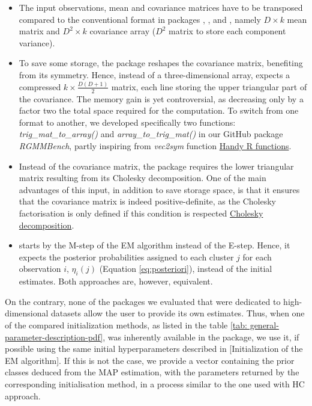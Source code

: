\begin{itemize}
\item
  The input observations, mean and covariance matrices have to be transposed compared to the conventional format in packages , ,  and , namely \(D \times k\) mean matrix and \(D^2 \times k\) covariance array (\(D^2\) matrix to store each component variance).
\item
  To save some storage, the  package reshapes the covariance matrix, benefiting from its symmetry. Hence, instead of a three-dimensional array,  expects a compressed \(k \times \frac{D(D+1)}{2}\) matrix, each line storing the upper triangular part of the covariance. The memory gain is yet controversial, as decreasing only by a factor two the total space required for the computation. To switch from one format to another, we developed specifically two functions: \emph{trig\_mat\_to\_array()} and \emph{array\_to\_trig\_mat()} in our GitHub package \emph{RGMMBench}, partly inspiring from \emph{vec2sym} function \href{https://rdrr.io/github/patr1ckm/patr1ckm/man/vec2sym.html}{Handy R functions}.
\item
  Instead of the covariance matrix, the  package requires the lower triangular matrix resulting from its Cholesky decomposition. One of the main advantages of this input, in addition to save storage space, is that it ensures that the covariance matrix is indeed positive-definite, as the Cholesky factorisation is only defined if this condition is respected \href{https://en.wikipedia.org/wiki/Cholesky_decomposition}{Cholesky decomposition}.
\item
   starts by the M-step of the EM algorithm instead of the E-step. Hence, it expects the posterior probabilities assigned to each cluster \(j\) for each observation \(i\), \(\eta_i(j)\) (Equation \eqref{eq:posteriori}), instead of the initial estimates. Both approaches are, however, equivalent.
\end{itemize}

\color{green}

On the contrary, none of the packages we evaluated that were dedicated to high-dimensional datasets allow the user to provide its own estimates. Thus, when one of the compared initialization methods, as listed in the table \ref{tab: general-parameter-description-pdf}, was inherently available in the package, we use it, if possible using the same initial hyperparameters described in {[}Initialization of the EM algorithm{]}. If this is not the case, we provide a vector containing the prior classes deduced from the MAP estimation, with the parameters returned by the corresponding initialisation method, in a process similar to the one used with HC approach.
\color{black}

